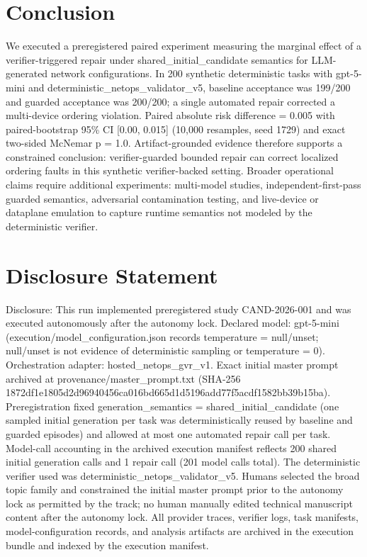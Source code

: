 \documentclass[conference]{IEEEtran}
\begin{document}
\section{Conclusion}
We executed a preregistered paired experiment measuring the marginal effect of a verifier-triggered repair under shared\_initial\_candidate semantics for LLM-generated network configurations. In 200 synthetic deterministic tasks with gpt-5-mini and deterministic\_netops\_validator\_v5, baseline acceptance was 199/200 and guarded acceptance was 200/200; a single automated repair corrected a multi-device ordering violation. Paired absolute risk difference = 0.005 with paired-bootstrap 95\% CI [0.00, 0.015] (10,000 resamples, seed 1729) and exact two-sided McNemar p = 1.0. Artifact-grounded evidence therefore supports a constrained conclusion: verifier-guarded bounded repair can correct localized ordering faults in this synthetic verifier-backed setting. Broader operational claims require additional experiments: multi-model studies, independent-first-pass guarded semantics, adversarial contamination testing, and live-device or dataplane emulation to capture runtime semantics not modeled by the deterministic verifier.

\section*{Disclosure Statement}
Disclosure: This run implemented preregistered study CAND-2026-001 and was executed autonomously after the autonomy lock. Declared model: gpt-5-mini (execution/model\_configuration.json records temperature = null/unset; null/unset is not evidence of deterministic sampling or temperature = 0). Orchestration adapter: hosted\_netops\_gvr\_v1. Exact initial master prompt archived at provenance/master\_prompt.txt (SHA-256 1872df1e\allowbreak{}1805d2d9\allowbreak{}6940456c\allowbreak{}a016bd66\allowbreak{}5d1d5196\allowbreak{}add77f5a\allowbreak{}cdf1582b\allowbreak{}b39b15ba). Preregistration fixed generation\_semantics = shared\_initial\_candidate (one sampled initial generation per task was deterministically reused by baseline and guarded episodes) and allowed at most one automated repair call per task. Model-call accounting in the archived execution manifest reflects 200 shared initial generation calls and 1 repair call (201 model calls total). The deterministic verifier used was deterministic\_netops\_validator\_v5. Humans selected the broad topic family and constrained the initial master prompt prior to the autonomy lock as permitted by the track; no human manually edited technical manuscript content after the autonomy lock. All provider traces, verifier logs, task manifests, model-configuration records, and analysis artifacts are archived in the execution bundle and indexed by the execution manifest.
\end{document}
